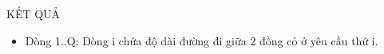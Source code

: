 KẾT QUẢ
\begin{itemize}
	\item     Dòng 1..Q: Dòng i chứa độ dài đường đi giữa 2 đồng cỏ         ở yêu cầu thứ i.   
\end{itemize}